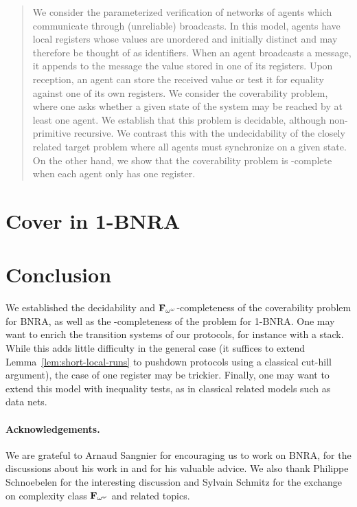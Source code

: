 \documentclass[runningheads]{llncs}
\begin{document}
	\begin{abstract}
	We consider the parameterized verification of networks of agents which communicate through (unreliable) broadcasts. In this model, agents have local registers whose values are unordered and initially distinct and may therefore be thought of as identifiers.
	When an agent broadcasts a message, it appends to the message the value stored in one of its registers. 
	Upon reception, an agent can store the received value or test it for equality against one of its own registers. 
	We consider the coverability problem, where one asks whether a given state of the system may be reached by at least one agent. We establish that this problem is decidable, although non-primitive recursive. We contrast this with the undecidability of the closely related target problem where all agents must synchronize on a given state. 
	On the other hand, we show that the coverability problem is \NP-complete when each agent only has one register.
	
	 
	\end{abstract}


	
%
	
	
	
	\section{Cover in 1-BNRA}
	\label{sec:cover-1BNRA}
	
	
%	
%
	\section{Conclusion}
	We established the decidability and $\mathbf{F}_{\omega^\omega}$-completeness of the coverability problem for BNRA, as well as the \NP-completeness of the problem for 1-BNRA.
	One may want to enrich the transition systems of our protocols, for instance with a stack. While this adds little difficulty in the general case (it suffices to extend Lemma~\ref{lem:short-local-runs} to pushdown protocols using a classical cut-hill argument), the case of one register may be trickier.
	Finally, one may want to extend this model with inequality tests, as in classical related models such as data nets.
	
	\paragraph*{Acknowledgements.} We are grateful to Arnaud Sangnier for encouraging us to work on BNRA, for the discussions about his work in \cite{DelzannoST13} and for his valuable advice. We also thank Philippe Schnoebelen for the interesting discussion and Sylvain Schmitz for the exchange on complexity class $\mathbf{F}_{\omega^{\omega}}$ and related topics.   
	
	
\end{document}
